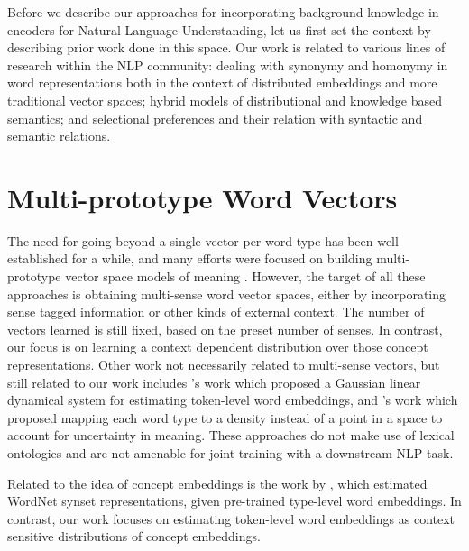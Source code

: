 Before we describe our approaches for incorporating background knowledge in encoders for Natural Language Understanding, let us first set the context by describing prior work done in this space. Our work is related to various lines of research within the NLP community: dealing with synonymy and homonymy in word representations both in the context of distributed embeddings and more traditional vector spaces; hybrid models of distributional and knowledge based semantics; and selectional preferences and their relation with syntactic and semantic relations.

\section{Multi-prototype Word Vectors}
The need for going beyond a single vector per word-type has been well established for a while, and many efforts were focused on building multi-prototype vector space models of meaning \cite[][etc.]{reisinger2010multi,huang2012improving,chen2014unified,jauhar:15,neelakantan2015efficient,arora2016linear}. However, the target of all these approaches is obtaining multi-sense word vector spaces, either by incorporating sense tagged information or other kinds of external context. The number of vectors learned is still fixed, based on the preset number of senses. In contrast, our focus is on learning a context dependent distribution over those concept representations. Other work not necessarily related to multi-sense vectors, but still related to our work includes \cite{belanger:15}'s work which proposed a Gaussian linear dynamical system for estimating token-level word embeddings, and \cite{Vilnis2014WordRV}'s work which proposed mapping each word type to a density instead of a point in a space to account for uncertainty in meaning. These approaches do not make use of lexical ontologies and are not amenable for joint training with a downstream NLP task. 

Related to the idea of concept embeddings is the work by \cite{rothe:15}, which estimated WordNet synset representations, given pre-trained type-level word embeddings.
In contrast, our work focuses on estimating token-level word embeddings as context sensitive distributions of concept embeddings.

